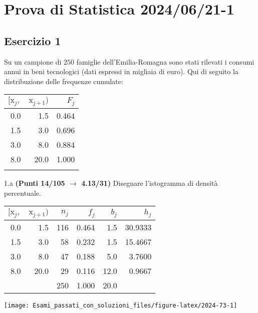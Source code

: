 \documentclass[
  11pt,
]{book}
\theoremstyle{mytheoremstyle}
\theoremstyle{mydefstyle}
\newenvironment{sol}
  {
  \begin{tcolorbox}[enhanced,breakable,arc=0.1mm,boxrule=1pt,colback=white,colframe=iblue,
  title=\bf \fontfamily{lmss}\selectfont \hspace{.5 cm} Soluzione,drop fuzzy shadow]

}{
\end{tcolorbox}
  }
\begin{document}
\section{Prova di Statistica 2024/06/21-1}\label{prova-di-statistica-20240621-1}

\subsection{Esercizio 1}\label{esercizio-1-38}

Su un campione di \(250\) famiglie dell'Emilia-Romagna sono stati rilevati i consumi annui in beni tecnologici (dati espressi in migliaia di euro). Qui di seguito la distribuzione delle frequenze cumulate:

\begin{table}[H]
\centering
\begin{tabular}{rrr}
\toprule
$[\text{x}_j,$ & $\text{x}_{j+1})$ & $F_j$\\
\midrule
0.0 & 1.5 & 0.464\\
1.5 & 3.0 & 0.696\\
3.0 & 8.0 & 0.884\\
8.0 & 20.0 & 1.000\\
 &  & \\
\bottomrule
\end{tabular}
\end{table}

1.a \textbf{(Punti 14/105 \(\rightarrow\) 4.13/31)} Disegnare l'istogramma di densità percentuale.

\begin{sol}

\begin{table}[H]
\centering
\begin{tabular}{rrrrrr}
\toprule
$[\text{x}_j,$ & $\text{x}_{j+1})$ & $n_j$ & $f_j$ & $b_j$ & $h_j$\\
\midrule
0.0 & 1.5 & 116 & 0.464 & 1.5 & 30.9333\\
1.5 & 3.0 & 58 & 0.232 & 1.5 & 15.4667\\
3.0 & 8.0 & 47 & 0.188 & 5.0 & 3.7600\\
8.0 & 20.0 & 29 & 0.116 & 12.0 & 0.9667\\
 &  & 250 & 1.000 & 20.0 & \\
\bottomrule
\end{tabular}
\end{table}

\begin{center}\texttt{[image: Esami\_passati\_con\_soluzioni\_files/figure-latex/2024-73-1]} \end{center}

\end{sol}
\end{document}
